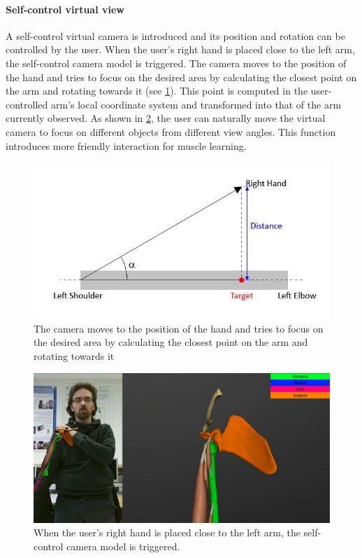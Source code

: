\paragraph{Self-control virtual view}
A self-control virtual camera is introduced and its position and rotation can be controlled by the user. When the user's right hand is placed close to the left arm, the self-control camera model is triggered. The camera moves to the position of the hand and tries to focus on the desired area by calculating the closest point on the arm and rotating towards it (see \figurename{\ref{fig:3-IMR:selfControlCamera}}). This point is computed in the user-controlled arm's local coordinate system and transformed into that of the arm currently observed. As shown in \figurename{\ref{fig:3-IMR:MuscleLearningSelfControlCamera}}, the user can naturally move the virtual camera to focus on different objects from different view angles. This function introduces more friendly interaction for muscle learning.
\begin{figure}
\centering
\includegraphics[width=0.7\linewidth]{figures/3-IMR/selfControlCamera}
\caption{The camera moves to the position of the hand and tries to focus on the desired area by calculating the closest point on the arm and rotating towards it}
\label{fig:3-IMR:selfControlCamera}
\end{figure}

\begin{figure}
	\centering
	\includegraphics[width=0.8\linewidth]{figures/3-IMR/MuscleLearningSelfControlCamera}
	\caption{When the user's right hand is placed close to the left arm, the self-control camera model is triggered.}
	\label{fig:3-IMR:MuscleLearningSelfControlCamera}
\end{figure}
